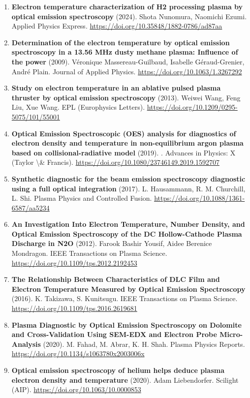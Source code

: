 \documentclass[11pt,a4paper]{article}
\begin{document}
\begin{enumerate}[leftmargin=1.4em]
\item \textbf{Electron temperature characterization of H2 processing plasma by optical emission spectroscopy} (2024). Shota Nunomura, Naomichi Ezumi. Applied Physics Express. \url{https://doi.org/10.35848/1882-0786/ad87aa}
\item \textbf{Determination of the electron temperature by optical emission spectroscopy in a 13.56 MHz dusty methane plasma: Influence of the power} (2009). Véronique Massereau-Guilbaud, Isabelle Géraud-Grenier, André Plain. Journal of Applied Physics. \url{https://doi.org/10.1063/1.3267292}
\item \textbf{Study on electron temperature in an ablative pulsed plasma thruster by optical emission spectroscopy} (2013). Weiwei Wang, Feng Liu, Xue Wang. EPL (Europhysics Letters). \url{https://doi.org/10.1209/0295-5075/101/55001}
\item \textbf{Optical Emission Spectroscopic (OES) analysis for diagnostics of electron density and temperature in non-equilibrium argon plasma based on collisional-radiative model} (2019). . Advances in Physics: X (Taylor \textbackslash{}\& Francis). \url{https://doi.org/10.1080/23746149.2019.1592707}
\item \textbf{Synthetic diagnostic for the beam emission spectroscopy diagnostic using a full optical integration} (2017). L. Hausammann, R. M. Churchill, L. Shi. Plasma Physics and Controlled Fusion. \url{https://doi.org/10.1088/1361-6587/aa5234}
\item \textbf{An Investigation Into Electron Temperature, Number Density, and Optical Emission Spectroscopy of the DC Hollow-Cathode Plasma Discharge in N2O} (2012). Farook Bashir Yousif, Aidee Berenice Mondragon. IEEE Transactions on Plasma Science. \url{https://doi.org/10.1109/tps.2012.2192453}
\item \textbf{The Relationship Between Characteristics of DLC Film and Electron Temperature Measured by Optical Emission Spectroscopy} (2016). K. Takizawa, S. Kunitsugu. IEEE Transactions on Plasma Science. \url{https://doi.org/10.1109/tps.2016.2619681}
\item \textbf{Plasma Diagnostic by Optical Emission Spectroscopy on Dolomite and Cross-Validation Using SEM-EDX and Electron Probe Micro-Analysis} (2020). M. Fahad, M. Abrar, K. H. Shah. Plasma Physics Reports. \url{https://doi.org/10.1134/s1063780x2003006x}
\item \textbf{Optical emission spectroscopy of helium helps deduce plasma electron density and temperature} (2020). Adam Liebendorfer. Scilight (AIP). \url{https://doi.org/10.1063/10.0000853}

\end{enumerate}
\end{document}

